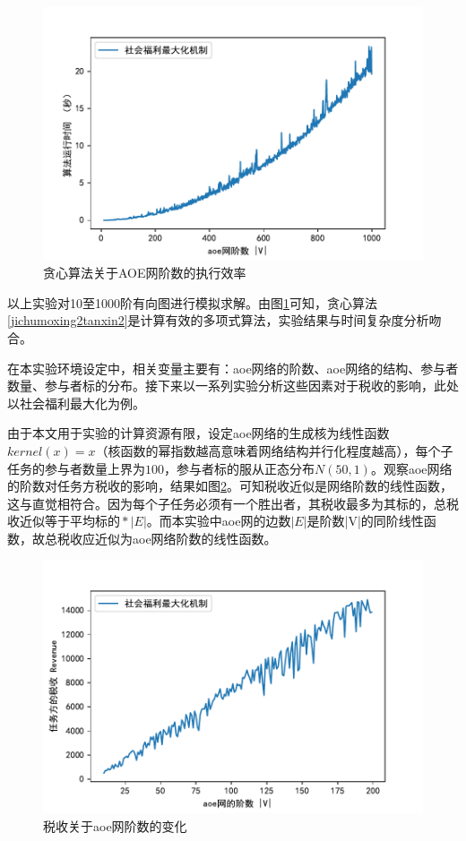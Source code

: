 \documentclass[promaster]{thesis-uestc}
\begin{document}
\begin{figure}[H]
    \includegraphics[width=325pt]{exp/exetime.pdf}
    \caption{贪心算法关于AOE网阶数的执行效率}
    \label{exetime}
\end{figure}

以上实验对10至1000阶有向图进行模拟求解。由图\ref{exetime}可知，贪心算法\ref{jichumoxing2tanxin2}是计算有效的多项式算法，实验结果与时间复杂度分析吻合。

在本实验环境设定中，相关变量主要有：aoe网络的阶数、aoe网络的结构、参与者数量、参与者标的分布。接下来以一系列实验分析这些因素对于税收的影响，此处以社会福利最大化为例。

由于本文用于实验的计算资源有限，设定aoe网络的生成核为线性函数$kernel(x)=x$（核函数的幂指数越高意味着网络结构并行化程度越高），每个子任务的参与者数量上界为$100$，参与者标的服从正态分布$N(50,1)$。观察aoe网络的阶数对任务方税收的影响，结果如图\ref{revenuevsv}。可知税收近似是网络阶数的线性函数，这与直觉相符合。因为每个子任务必须有一个胜出者，其税收最多为其标的，总税收近似等于$\text{平均标的}*|E|$。而本实验中aoe网的边数$|E|$是阶数|V|的同阶线性函数，故总税收应近似为aoe网络阶数的线性函数。

\begin{figure}[H]
    \includegraphics[width=325pt]{exp/revenuevsv.pdf}
    \caption{税收关于aoe网阶数的变化}
    \label{revenuevsv}
\end{figure}
\end{document}
